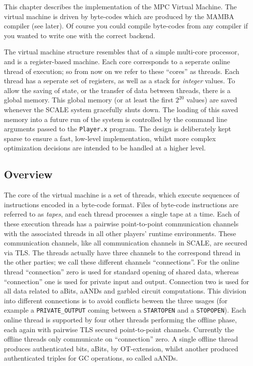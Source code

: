 
\label{ch:vm}

This chapter describes the implementation of the
MPC Virtual Machine. 
The virtual machine is driven by byte-codes which
are produced by the MAMBA compiler (see later).
Of course you could compile byte-codes from any compiler
if you wanted to write one with the correct backend.

The virtual machine structure resembles that of a
simple multi-core processor, and is a register-based
machine.
Each core corresponds to a seperate online thread
of execution; so from now on we refer to these ``cores''
as threads.
Each thread has a seperate set of registers, as
well as a stack for {\em integer} values.
To allow the saving of state, or the transfer of data
between threads, there is a global memory.
This global memory (or at least the first $2^{20}$
values) are saved whenever the SCALE system gracefully
shuts down.
The loading of this saved memory into a future run of the
system is controlled by the command line arguments
passed to the \verb+Player.x+ program.
The design is deliberately kept sparse to ensure a fast, low-level 
implementation, whilst more complex optimization decisions are intended 
to be handled at a higher level.

\subsection{Overview}

The core of the virtual machine is a set of threads, which
execute sequences of instructions encoded in a byte-code format.
Files of byte-code instructions are referred to as \emph{tapes},
and each thread processes a single tape at a time.
Each of these execution threads has a pairwise point-to-point
communication channels with the associated threads in all
other players' runtime environments.
These communication channels, like all communication channels
in SCALE, are secured via TLS.
The threads actually have three channels to the correspond
thread in the other parties; we call these different channels
``connections''.
For the online thread ``connection'' zero is used for standard
opening of shared data, whereas ``connection'' one is used for
private input and output.
Connection two is used for all data related to aBits, aANDs
and garbled circuit computations.
This division into different connections is to avoid conflicts beween
the three usages (for example a \verb+PRIVATE_OUTPUT+ coming between
a \verb+STARTOPEN+ and a \verb+STOPOPEN+).
Each online thread is supported by four other threads
performing the offline phase, each again with pairwise 
TLS secured point-to-point channels. Currently the offline
threads only communicate on ``connection'' zero.
A single offline thread produces authenticated bits, aBits,
by OT-extension, whilst another produced authenticated 
triples for GC operations, so called aANDs.

